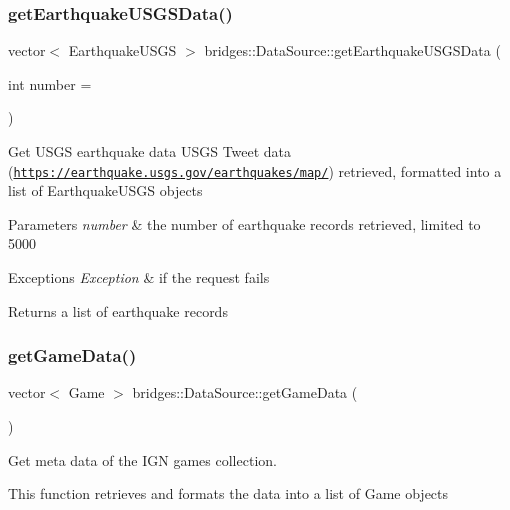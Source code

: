 \subsubsection{\texorpdfstring{get\+Earthquake\+U\+S\+G\+S\+Data()}{getEarthquakeUSGSData()}}
{\footnotesize\ttfamily vector$<$ Earthquake\+U\+S\+GS $>$ bridges\+::\+Data\+Source\+::get\+Earthquake\+U\+S\+G\+S\+Data (\begin{DoxyParamCaption}\item[{int}]{number = {} }\end{DoxyParamCaption})}

Get U\+S\+GS earthquake data U\+S\+GS Tweet data (\href{https://earthquake.usgs.gov/earthquakes/map/}{\tt https\+://earthquake.\+usgs.\+gov/earthquakes/map/}) retrieved, formatted into a list of Earthquake\+U\+S\+GS objects


\begin{DoxyParams}{Parameters}
{\em number} & the number of earthquake records retrieved, limited to 5000 \\
\hline
\end{DoxyParams}

\begin{DoxyExceptions}{Exceptions}
{\em Exception} & if the request fails\\
\hline
\end{DoxyExceptions}
\begin{DoxyReturn}{Returns}
a list of earthquake records 
\end{DoxyReturn}
\mbox{\label{namespacebridges_1_1_data_source_a96a28cc7f2a6013fe09b07cc53c7432f}} 
\subsubsection{\texorpdfstring{get\+Game\+Data()}{getGameData()}}
{\footnotesize\ttfamily vector$<$ Game $>$ bridges\+::\+Data\+Source\+::get\+Game\+Data (\begin{DoxyParamCaption}{ }\end{DoxyParamCaption})}

Get meta data of the I\+GN games collection.

This function retrieves and formats the data into a list of Game objects



